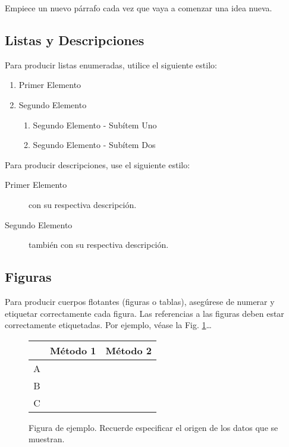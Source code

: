 \documentclass[a4paper]{article}
\begin{document}
		Empiece un nuevo párrafo cada vez que vaya a comenzar una idea nueva.

	\subsection{Listas y Descripciones}\label{sub:lists}
		Para producir listas enumeradas, utilice el siguiente estilo:
		\begin{enumerate}
			\item Primer Elemento
			\item Segundo Elemento
			\begin {enumerate}
				\item {Segundo Elemento - Subítem Uno}
				\item {Segundo Elemento - Subítem Dos}
			\end {enumerate}
		\end{enumerate}

		Para producir descripciones, use el siguiente estilo:

		\begin{description}
			\item [Primer Elemento] con su respectiva descripción.
			\item [Segundo Elemento] también con su respectiva descripción.
		\end{description}

	\subsection{Figuras}\label{sub:figures}
		Para producir cuerpos flotantes (figuras o tablas), asegúrese de numerar
		y etiquetar correctamente cada figura. Las referencias a las figuras deben
		estar correctamente etiquetadas. Por ejemplo, véase la Fig. \ref{fig:ex}\ldots

		\begin{figure}[h!]%
		\begin{center}
			\begin{tabular}{|c|c|c|} \hline
			 			& Método 1 	& Método 2 	\\ \hline
			A 			&  			&  			\\ \hline
			B			& 			& 			\\ \hline
			C 			& 			&  			\\ \hline
			\end{tabular}
		\caption{Figura de ejemplo. Recuerde especificar el origen de los datos que se muestran. \label{fig:ex}}
		\end{center}
		\end{figure}
\end{document}
